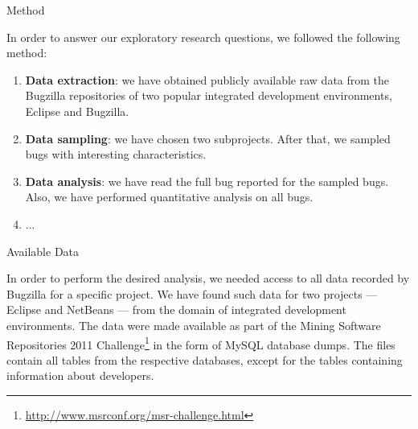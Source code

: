 \begin{section}{Method}


In order to answer our exploratory research questions, we followed the following method:

\begin{enumerate}
	\item \textbf{Data extraction}: we have obtained publicly available raw data from the Bugzilla repositories of two popular integrated development environments, Eclipse and Bugzilla.
	
	\item \textbf{Data sampling}: we have chosen two subprojects. After that, we sampled bugs with interesting characteristics.
	
	\item \textbf{Data analysis}: we have read the full bug reported for the sampled bugs. Also, we have performed quantitative analysis on all bugs.
	
	\item ...
\end{enumerate}

\begin{subsection}{Available Data}
	
	In order to perform the desired analysis, we needed access to all data recorded by Bugzilla for a specific project. We have found such data for two projects --- Eclipse and NetBeans --- from the domain of integrated development environments. The data were made available as part of the Mining Software Repositories 2011 Challenge\footnote{\url{http://www.msrconf.org/msr-challenge.html}} in the form of MySQL database dumps. The files contain all tables from the respective databases, except for the tables containing information about developers.
	


\end{subsection}
\end{section}
